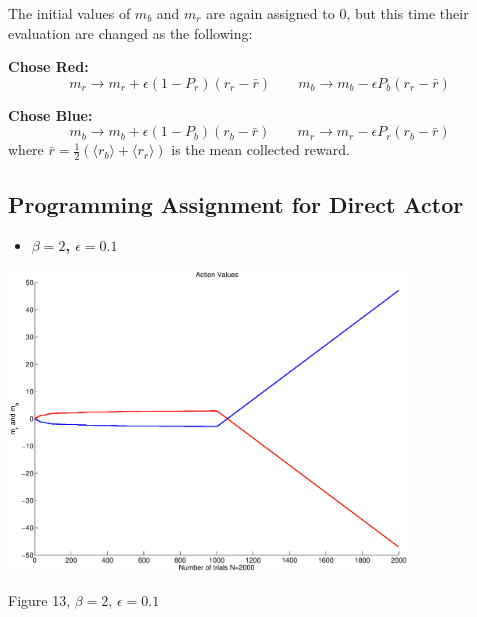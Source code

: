 \documentclass{article}
\begin{document}
The initial values of $m_b$ and $m_r$ are again assigned to 0, but this time their evaluation are changed as the following:


\textbf{Chose Red:}
\begin{equation*}
 m_r\rightarrow m_r + \epsilon (1-P_r)(r_r-{\bar r})  \;\;\;\;\;\;\; m_b\rightarrow m_b - \epsilon P_b(r_r-{\bar r}) 
\end{equation*}

\textbf{Chose Blue:}
\begin{equation*}
 m_b\rightarrow m_b + \epsilon (1-P_b)(r_b-{\bar r})  \;\;\;\;\;\;\; m_r\rightarrow m_r - \epsilon P_r(r_b-{\bar r}) 
\end{equation*}
where ${\bar r}=\frac{1}{2}(\langle r_b\rangle + \langle r_r\rangle)$ is the mean collected reward.

\subsection{Programming Assignment for Direct Actor}

\begin{itemize}
 \item \textbf{ $\beta=2$, $\epsilon=0.1$}
\end{itemize}

\begin{center}
\includegraphics[width=\textwidth, height=80mm]{d_action1.eps}
\begin{footnotesize}
 Figure 13, $\beta=2$, $\epsilon=0.1$
\end{footnotesize}
\end{center}
\end{document}

